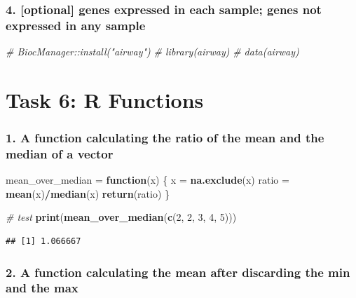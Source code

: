 \documentclass[
]{article}
\newenvironment{Shaded}{\begin{snugshade}}{\end{snugshade}}
\newcommand{\CommentTok}[1]{\textcolor[rgb]{0.56,0.35,0.01}{\textit{#1}}}
\newcommand{\ControlFlowTok}[1]{\textcolor[rgb]{0.13,0.29,0.53}{\textbf{#1}}}
\newcommand{\DecValTok}[1]{\textcolor[rgb]{0.00,0.00,0.81}{#1}}
\newcommand{\FunctionTok}[1]{\textcolor[rgb]{0.13,0.29,0.53}{\textbf{#1}}}
\newcommand{\NormalTok}[1]{#1}
\newcommand{\OtherTok}[1]{\textcolor[rgb]{0.56,0.35,0.01}{#1}}
\newcommand{\SpecialCharTok}[1]{\textcolor[rgb]{0.81,0.36,0.00}{\textbf{#1}}}
\begin{document}
\subsubsection{4. {[}optional{]} genes expressed in each sample; genes
not expressed in any
sample}\label{optional-genes-expressed-in-each-sample-genes-not-expressed-in-any-sample}

\begin{Shaded}
\begin{Highlighting}[]
\CommentTok{\# BiocManager::install("airway")}
\CommentTok{\# library(\textquotesingle{}airway\textquotesingle{})}
\CommentTok{\# data(\textquotesingle{}airway\textquotesingle{})}
\end{Highlighting}
\end{Shaded}

\section{Task 6: R Functions}\label{task-6-r-functions}

\subsubsection{1. A function calculating the ratio of the mean and the
median of a
vector}\label{a-function-calculating-the-ratio-of-the-mean-and-the-median-of-a-vector}

\begin{Shaded}
\begin{Highlighting}[]
\NormalTok{mean\_over\_median }\OtherTok{=} \ControlFlowTok{function}\NormalTok{(x) \{}
\NormalTok{  x }\OtherTok{=} \FunctionTok{na.exclude}\NormalTok{(x)}
\NormalTok{  ratio }\OtherTok{=} \FunctionTok{mean}\NormalTok{(x)}\SpecialCharTok{/}\FunctionTok{median}\NormalTok{(x)}
  \FunctionTok{return}\NormalTok{(ratio)}
\NormalTok{\}}

\CommentTok{\# test}
\FunctionTok{print}\NormalTok{(}\FunctionTok{mean\_over\_median}\NormalTok{(}\FunctionTok{c}\NormalTok{(}\DecValTok{2}\NormalTok{, }\DecValTok{2}\NormalTok{, }\DecValTok{3}\NormalTok{, }\DecValTok{4}\NormalTok{, }\DecValTok{5}\NormalTok{)))}
\end{Highlighting}
\end{Shaded}

\begin{verbatim}
## [1] 1.066667
\end{verbatim}

\subsubsection{2. A function calculating the mean after discarding the
min and the
max}\label{a-function-calculating-the-mean-after-discarding-the-min-and-the-max}
\end{document}
